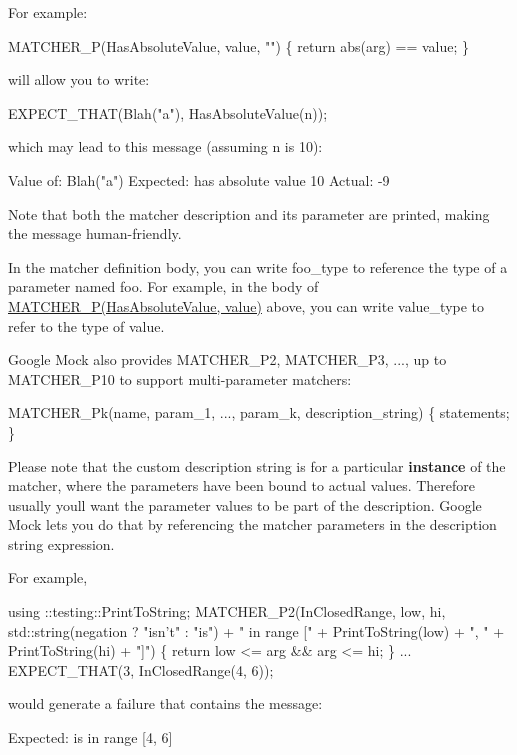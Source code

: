 For example\+: 
\begin{DoxyCode}
MATCHER\_P(HasAbsoluteValue, value, "") \{ return abs(arg) == value; \}
\end{DoxyCode}
 will allow you to write\+: 
\begin{DoxyCode}
EXPECT\_THAT(Blah("a"), HasAbsoluteValue(n));
\end{DoxyCode}
 which may lead to this message (assuming {\ttfamily n} is 10)\+: 
\begin{DoxyCode}
Value of: Blah("a")
Expected: has absolute value 10
  Actual: -9
\end{DoxyCode}


Note that both the matcher description and its parameter are printed, making the message human-\/friendly.

In the matcher definition body, you can write {\ttfamily foo\+\_\+type} to reference the type of a parameter named {\ttfamily foo}. For example, in the body of {\ttfamily \hyperlink{gmock-generated-matchers_8h_acb7ae915efa2fd8d3f6ea7313198afb6}{M\+A\+T\+C\+H\+E\+R\+\_\+\+P(\+Has\+Absolute\+Value, value)}} above, you can write {\ttfamily value\+\_\+type} to refer to the type of {\ttfamily value}.

Google Mock also provides {\ttfamily M\+A\+T\+C\+H\+E\+R\+\_\+\+P2}, {\ttfamily M\+A\+T\+C\+H\+E\+R\+\_\+\+P3}, ..., up to {\ttfamily M\+A\+T\+C\+H\+E\+R\+\_\+\+P10} to support multi-\/parameter matchers\+: 
\begin{DoxyCode}
MATCHER\_Pk(name, param\_1, ..., param\_k, description\_string) \{ statements; \}
\end{DoxyCode}


Please note that the custom description string is for a particular {\bfseries instance} of the matcher, where the parameters have been bound to actual values. Therefore usually you\textquotesingle{}ll want the parameter values to be part of the description. Google Mock lets you do that by referencing the matcher parameters in the description string expression.

For example, 
\begin{DoxyCode}
using ::testing::PrintToString;
MATCHER\_P2(InClosedRange, low, hi,
           std::string(negation ? "isn't" : "is") + " in range [" +
           PrintToString(low) + ", " + PrintToString(hi) + "]") \{
  return low <= arg && arg <= hi;
\}
...
EXPECT\_THAT(3, InClosedRange(4, 6));
\end{DoxyCode}
 would generate a failure that contains the message\+: 
\begin{DoxyCode}
Expected: is in range [4, 6]
\end{DoxyCode}


